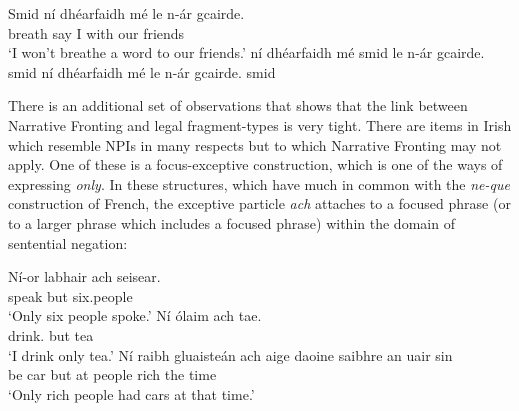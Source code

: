 \documentclass[output=paper,colorlinks,citecolor=brown]{langscibook}
\begin{document}
\ea\label{ex:minimizer2}
\ea
\gll Smid ní dhéarfaidh mé le n-ár gcairde. \\
     breath {\no} {say\fut} I with our friends \\
\glt `I won't breathe a word to our friends.'
\ex
\ea ní dhéarfaidh mé smid le n-ár gcairde.
\ex smid ní dhéarfaidh mé {\gapline} le n-ár gcairde.
\ex smid 
\z
\z
\z
{}

There is an additional set of observations that shows that the link between Narrative Fronting and legal fragment-types is very tight.  There are items in Irish which resemble NPIs in many respects but to which Narrative Fronting may not apply. One of these is a focus\hyp exceptive construction, which is one of the ways of expressing {\itshape only}.  In these structures, which have much in common with the \textit{ne-que} construction of French, the exceptive particle {\itshape ach} attaches to a focused phrase (or to a larger phrase which includes a focused phrase) within the domain of sentential negation: 

\ea\label{ex:ach}
\ea
\gll Ní-or     labhair      ach seisear. \\
     {\nior}  {speak\past}  but {six.people} \\
\glt `Only six people spoke.'
\ex
\gll Ní ólaim ach tae. \\
     {\no} {drink\pres.\my} but tea \\
\glt `I drink only tea.'
\ex
\gll Ní     raibh    gluaisteán ach aige daoine saibhre an uair sin\\
    {\no} {be\past} car        but at people rich the time {\seo}\\
\glt `Only rich people had cars at that time.'
\z
\z

\end{document}
